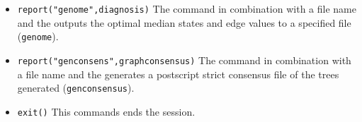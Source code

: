 \begin{itemize}
\item \texttt{report("genome",diagnosis)}  The  command in combination with a file name and the  outputs the optimal median states and edge values to a specified file (\texttt{genome}). 
\item \texttt{report("genconsens",graphconsensus)}  The  command in combination with a file name and the  generates a postscript strict consensus file of the trees generated (\texttt{genconsensus}). 
\item \texttt{exit()} This commands ends the \poy session.
\end{itemize}
